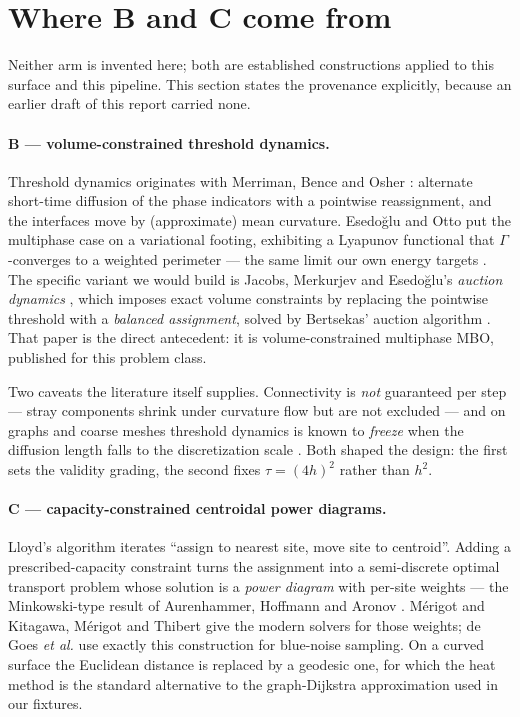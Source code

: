 \documentclass[11pt,a4paper]{article}
\begin{document}
\section{Where B and C come from}
\label{sec:literature}

Neither arm is invented here; both are established constructions applied to this
surface and this pipeline. This section states the provenance explicitly, because
an earlier draft of this report carried none.

\paragraph{B --- volume-constrained threshold dynamics.} Threshold dynamics
originates with Merriman, Bence and Osher \cite{merriman1994motion}: alternate
short-time diffusion of the phase indicators with a pointwise reassignment, and
the interfaces move by (approximate) mean curvature. Esedo\u{g}lu and Otto
\cite{esedoglu2015threshold} put the multiphase case on a variational footing,
exhibiting a Lyapunov functional that \(\Gamma\)-converges to a weighted
perimeter --- the same limit our own energy targets \cite{bogosel2017partitions,
modica1977esempio}. The specific variant we would build is Jacobs, Merkurjev and
Esedo\u{g}lu's \emph{auction dynamics} \cite{jacobs2018auction}, which imposes exact
volume constraints by replacing the pointwise threshold with a
\emph{balanced assignment}, solved by Bertsekas' auction algorithm
\cite{bertsekas1988auction}. That paper is the direct antecedent: it is
volume-constrained multiphase MBO, published for this problem class.

Two caveats the literature itself supplies. Connectivity is \emph{not}
guaranteed per step --- stray components shrink under curvature flow but are not
excluded --- and on graphs and coarse meshes threshold dynamics is known to
\emph{freeze} when the diffusion length falls to the discretization scale
\cite{vangennip2014mean}. Both shaped the design: the first sets the validity
grading, the second fixes \(\tau = (4h)^2\) rather than \(h^2\).

\paragraph{C --- capacity-constrained centroidal power diagrams.} Lloyd's
algorithm \cite{lloyd1982least} iterates ``assign to nearest site, move site to
centroid''. Adding a prescribed-capacity constraint turns the assignment into a
semi-discrete optimal transport problem whose solution is a \emph{power diagram}
with per-site weights --- the Minkowski-type result of Aurenhammer, Hoffmann and
Aronov \cite{aurenhammer1998minkowski}. M\'erigot \cite{merigot2011multiscale}
and Kitagawa, M\'erigot and Thibert \cite{kitagawa2019convergence} give the
modern solvers for those weights; de Goes \emph{et al.}
\cite{degoes2012bluenoise} use exactly this construction for blue-noise
sampling. On a curved surface the Euclidean distance is replaced by a geodesic
one, for which the heat method \cite{crane2013geodesics} is the standard
alternative to the graph-Dijkstra approximation used in our fixtures.
\end{document}
